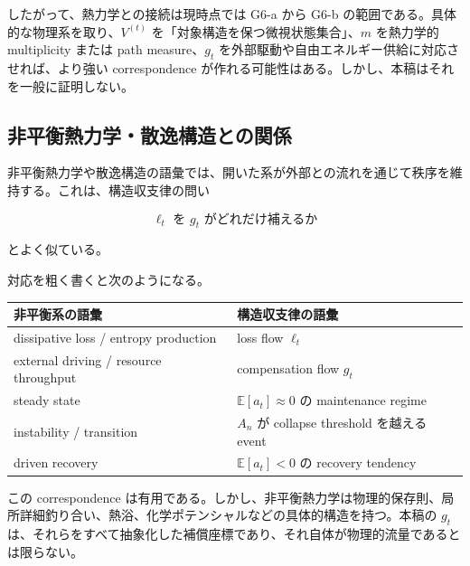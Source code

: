 \documentclass[12pt,a4paper]{article}
\begin{document}
したがって、熱力学との接続は現時点では G6-a から G6-b の範囲である。具体的な物理系を取り、\(V^{(t)}\) を「対象構造を保つ微視状態集合」、\(m\) を熱力学的 multiplicity または path measure、\(g_{t}\) を外部駆動や自由エネルギー供給に対応させれば、より強い correspondence が作れる可能性はある。しかし、本稿はそれを一般に証明しない。

\subsection{非平衡熱力学・散逸構造との関係}\label{ux975eux5e73ux8861ux71b1ux529bux5b66ux6563ux9038ux69cbux9020ux3068ux306eux95a2ux4fc2}

非平衡熱力学や散逸構造の語彙では、開いた系が外部との流れを通じて秩序を維持する。これは、構造収支律の問い

\[
\ell_{t} \text{ を } g_{t} \text{ がどれだけ補えるか}
\]

とよく似ている。

対応を粗く書くと次のようになる。

{\def\LTcaptype{table} %
\begin{longtable}[]{@{}
  >{\raggedright\arraybackslash}p{}
  >{\raggedright\arraybackslash}p{}@{}}
\toprule\noalign{}
\begin{minipage}[b]{\linewidth}\raggedright
非平衡系の語彙
\end{minipage} & \begin{minipage}[b]{\linewidth}\raggedright
構造収支律の語彙
\end{minipage} \\
\midrule\noalign{}
\endhead
\bottomrule\noalign{}
\endlastfoot
dissipative loss / entropy production & loss flow \(\ell_t\) \\
external driving / resource throughput & compensation flow \(g_t\) \\
steady state & \(\mathbb E[a_t]\approx 0\) の maintenance regime \\
instability / transition & \(A_n\) が collapse threshold を越える event \\
driven recovery & \(\mathbb E[a_t]<0\) の recovery tendency \\
\end{longtable}
}

この correspondence は有用である。しかし、非平衡熱力学は物理的保存則、局所詳細釣り合い、熱浴、化学ポテンシャルなどの具体的構造を持つ。本稿の \(g_{t}\) は、それらをすべて抽象化した補償座標であり、それ自体が物理的流量であるとは限らない。
\end{document}

